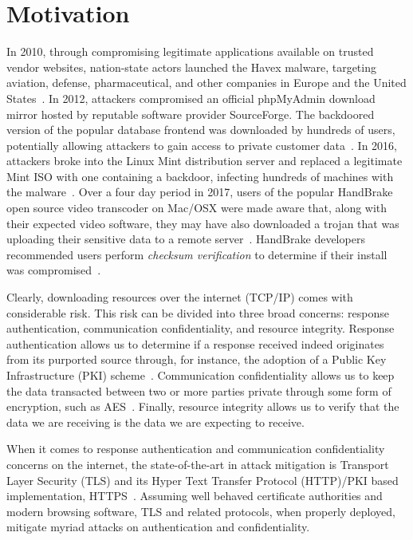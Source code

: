 \section{Motivation} \label{sec:hc-motivation}

In 2010, through compromising legitimate applications available on trusted
vendor websites, nation-state actors launched the Havex malware, targeting
aviation, defense, pharmaceutical, and other companies in Europe and the United
States~\cite{SCA-HAVEX1, SCA-HAVEX2}. In 2012, attackers compromised an official
phpMyAdmin download mirror hosted by reputable software provider SourceForge.
The backdoored version of the popular database frontend was downloaded by
hundreds of users, potentially allowing attackers to gain access to private
customer data~\cite{SCA-PMA1, SCA-PMA2}. In 2016, attackers broke into the Linux
Mint distribution server and replaced a legitimate Mint ISO with one containing
a backdoor, infecting hundreds of machines with the malware~\cite{SCA-MINT1,
SCA-MINT2}. Over a four day period in 2017, users of the popular HandBrake open
source video transcoder on Mac/OSX were made aware that, along with their
expected video software, they may have also downloaded a trojan that was
uploading their sensitive data to a remote server~\cite{SCA-HB1}. HandBrake
developers recommended users perform \emph{checksum verification} to determine
if their install was compromised~\cite{SCA-HB2}.

Clearly, downloading resources over the internet (TCP/IP) comes with
considerable risk. This risk can be divided into three broad concerns: response
authentication, communication confidentiality, and resource integrity. Response
authentication allows us to determine if a response received indeed originates
from its purported source through, for instance, the adoption of a Public Key
Infrastructure (PKI) scheme~\cite{PKI}. Communication confidentiality allows us
to keep the data transacted between two or more parties private through some
form of encryption, such as AES~\cite{AES}. Finally, resource integrity allows
us to verify that the data we are receiving is the data we are expecting to
receive.

When it comes to response authentication and communication confidentiality
concerns on the internet, the state-of-the-art in attack mitigation is Transport
Layer Security (TLS) and its Hyper Text Transfer Protocol (HTTP)/PKI based
implementation, HTTPS~\cite{TLS1.2, TLS1, TLS0, HTTPS, PKI}. Assuming well
behaved certificate authorities and modern browsing software, TLS and related
protocols, when properly deployed, mitigate myriad attacks on authentication and
confidentiality.

